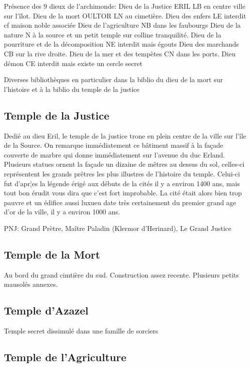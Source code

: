 Présence des 9 dieux de l'archimonde:
Dieu de la Justice ERIL LB en centre ville sur l'îlot.
Dieu de la mort OULTOR LN au cimetière.
Dieu des enfers LE interdit cf maison noble associée
Dieu de l'agriculture NB dans les faubourgs
Dieu de la nature N à la source et un petit temple sur colline tranquilité.
Dieu de la pourriture et de la décomposition NE interdit mais égouts
Dieu des marchands CB sur la rive droite.
Dieu de la mer et des tempètes CN dans les ports. 
Dieu démon CE interdit mais existe un cercle secret

Diverses bibliothèques en particulier dans la biblio du dieu de la mort
sur l'histoire et à la biblio du temple de la justice

\subsection{Temple de la Justice}

Dedié au dieu Eril, le temple de la justice trone en plein centre de la ville sur l'île de la Source.
On remarque immédiatement ce bâtiment massif à la façade couverte de marbre qui donne immédiatement
sur l'avenue du duc Erland. Plusieurs statues ornent la façade un dizaine de mêtres au dessus du sol,
celles-ci représentent les grands prêtres les plus illustres de l'histoire du temple. Celui-ci fut 
d'apr¦es la légende érigé aux débuts de la cités il y a environ 1400 ans, mais tout bon érudit vous
dira que c'est fort improbable. La cité était alors bien trop pauvre et un édifice aussi luxueu date très 
certainement du premier grand age d'or de la ville, il y a environ 1000 ans.

PNJ: Grand Prètre, Maître Paladin (Klermor d'Herinard), Le Grand Justice

\subsection{Temple de la Mort}

Au bord du grand cimtière du sud. Construction assez recente. Plusieurs petits mausolés annexes.

\subsection{Temple d'Azazel}

Temple secret dissimulé dans une famille de sorciers

\subsection{Temple de l'Agriculture}

